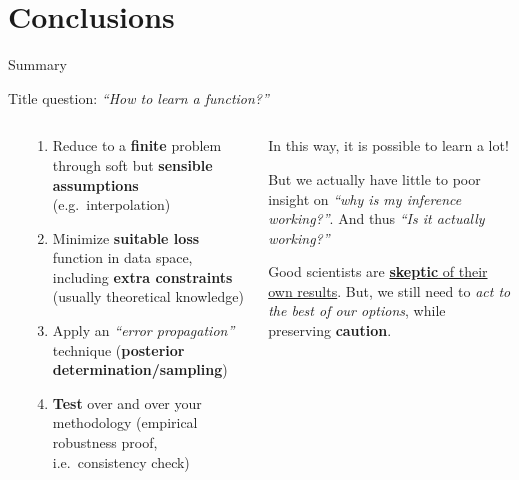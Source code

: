 \documentclass[9pt]{beamer}
\begin{document}
\section{Conclusions}

\begin{frame}{Summary}
    \vspace*{15pt}

    Title question: \textit{\enquote{How to learn a function?}}
    \vspace*{10pt}

    \begin{columns}
        \begin{column}{-0.05\textwidth}
        \end{column}
        \begin{column}{0.45\textwidth}
            \begin{enumerate}
                \item Reduce to a \alert{\textbf{finite} problem} through soft
                    but \textbf{sensible assumptions} (e.g.\ interpolation)
                \item \alert{Minimize \textbf{suitable loss}} function in data
                    space, including \textbf{extra constraints} (usually
                    theoretical knowledge)
                \item Apply an \alert{\textit{\enquote{error propagation}}}
                    technique (\textbf{posterior determination/sampling})
                \item \alert{\textbf{Test}} over and over your methodology
                    (empirical robustness proof, i.e.\ consistency check)
            \end{enumerate}
        \end{column}
        \begin{column}{0.45\textwidth}
            In this way, it is possible to learn a lot!
            \vspace*{10pt}
            
            But we actually have little to poor insight on \textit{\enquote{why
            is my inference working?}}. And thus \textit{\enquote{Is it
            actually working?}}
            \vspace*{10pt}

            Good scientists are \uline{\textbf{skeptic} of their own results}.
            But, we still need to \alert{\textit{act to the best of our
            options}}, while preserving \textbf{caution}.
        \end{column}
    \end{columns}
    \vspace*{-10pt}


\end{frame}
\end{document}
